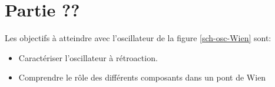 \documentclass[canadien,12pt,oneside,letterpaper]{article}
\begin{document}




\section{Partie ??}
Les objectifs à atteindre avec l'oscillateur de la figure \ref{sch-osc-Wien} sont:
\begin{itemize}
    \item Caractériser l'oscillateur à rétroaction.
    \item Comprendre le rôle des différents composants dans un pont de Wien
\end{itemize}
\end{document}
